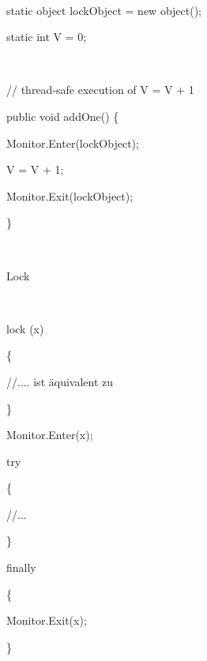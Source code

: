 ~

static object lockObject = new object(); 

static int V = 0; 

~

// thread-safe execution of V = V + 1 

public void addOne() \{ 

 Monitor.Enter(lockObject); 

 V = V + 1; 

 Monitor.Exit(lockObject); 

\}

~

Lock

~

lock (x)

\{

 //....  ist äquivalent zu 

\}

Monitor.Enter(x);

try

\{

 //...

\}

finally

\{

 Monitor.Exit(x);

\}
\endinput
